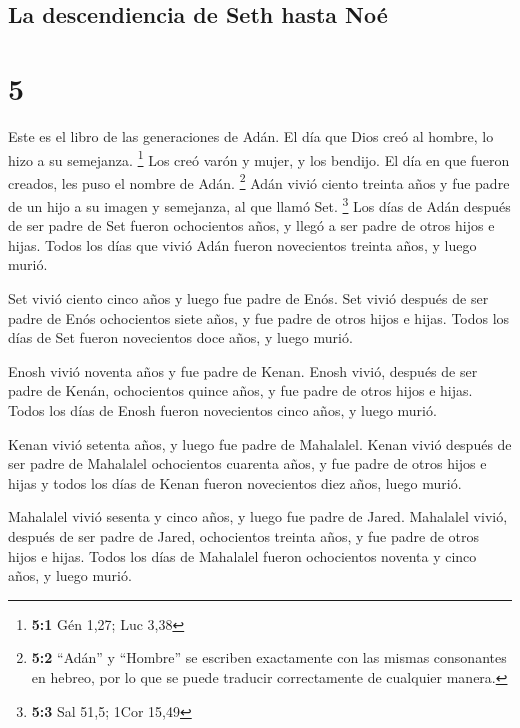 \hypertarget{la-descendiencia-de-seth-hasta-nouxe9}{%
\subsection{La descendiencia de Seth hasta
Noé}\label{la-descendiencia-de-seth-hasta-nouxe9}}

\hypertarget{section-4}{%
\section{5}\label{section-4}}

 Este es el libro de las generaciones de Adán. El día que
Dios creó al hombre, lo hizo a su semejanza. \footnote{\textbf{5:1} Gén
  1,27; Luc 3,38}  Los creó varón y mujer, y los bendijo.
El día en que fueron creados, les puso el nombre de Adán. \footnote{\textbf{5:2}
  ``Adán'' y ``Hombre'' se escriben exactamente con las mismas
  consonantes en hebreo, por lo que se puede traducir correctamente de
  cualquier manera.}  Adán vivió ciento treinta años y fue
padre de un hijo a su imagen y semejanza, al que llamó Set. \footnote{\textbf{5:3}
  Sal 51,5; 1Cor 15,49}  Los días de Adán después de ser
padre de Set fueron ochocientos años, y llegó a ser padre de otros hijos
e hijas.  Todos los días que vivió Adán fueron novecientos
treinta años, y luego murió.

 Set vivió ciento cinco años y luego fue padre de Enós.
 Set vivió después de ser padre de Enós ochocientos siete
años, y fue padre de otros hijos e hijas.  Todos los días
de Set fueron novecientos doce años, y luego murió.

 Enosh vivió noventa años y fue padre de Kenan.
 Enosh vivió, después de ser padre de Kenán, ochocientos
quince años, y fue padre de otros hijos e hijas.  Todos
los días de Enosh fueron novecientos cinco años, y luego murió.

 Kenan vivió setenta años, y luego fue padre de
Mahalalel.  Kenan vivió después de ser padre de Mahalalel
ochocientos cuarenta años, y fue padre de otros hijos e hijas
 y todos los días de Kenan fueron novecientos diez años,
luego murió.

 Mahalalel vivió sesenta y cinco años, y luego fue padre
de Jared.  Mahalalel vivió, después de ser padre de
Jared, ochocientos treinta años, y fue padre de otros hijos e hijas.
 Todos los días de Mahalalel fueron ochocientos noventa y
cinco años, y luego murió.


